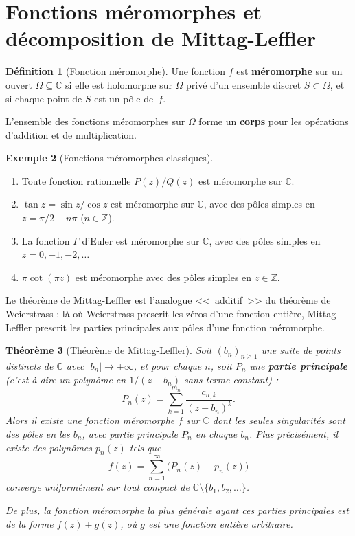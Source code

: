 \documentclass[12pt,a4paper,openany]{book}
\theoremstyle{definition}
\newtheorem{definition}{Définition}[chapter]
\newtheorem{exemple}[definition]{Exemple}
\theoremstyle{plain}
\newtheorem{theoreme}[definition]{Théorème}
\theoremstyle{remark}
\newcommand{\C}{\mathbb{C}}
\newcommand{\Z}{\mathbb{Z}}
\newcommand{\abs}[1]{\left|#1\right|}
\begin{document}
\section{Fonctions méromorphes et décomposition de Mittag-Leffler}%
\label{sec:mittag-leffler}

\begin{definition}[Fonction méromorphe]\label{def:fonction-meromorphe}
Une fonction $f$ est \textbf{méromorphe} sur un ouvert $\Omega \subseteq \C$
si elle est holomorphe sur $\Omega$ privé d'un ensemble discret $S \subset \Omega$,
et si chaque point de $S$ est un pôle de~$f$.

L'ensemble des fonctions méromorphes sur $\Omega$ forme un \textbf{corps}
pour les opérations d'addition et de multiplication.
\end{definition}

\begin{exemple}[Fonctions méromorphes classiques]\label{ex:meromorphes}
\begin{enumerate}[label=(\roman*)]
  \item Toute fonction rationnelle $P(z)/Q(z)$ est méromorphe sur $\C$.
  \item $\tan z = \sin z / \cos z$ est méromorphe sur $\C$, avec des pôles
    simples en $z = \pi/2 + n\pi$ ($n \in \Z$).
  \item La fonction $\Gamma$ d'Euler est méromorphe sur $\C$, avec des pôles
    simples en $z = 0, -1, -2, \ldots$
  \item $\pi \cot(\pi z)$ est méromorphe avec des pôles simples en $z \in \Z$.
\end{enumerate}
\end{exemple}

Le théorème de Mittag-Leffler est l'analogue <<~additif~>> du théorème de
Weierstrass : là où Weierstrass prescrit les zéros d'une fonction entière,
Mittag-Leffler prescrit les parties principales aux pôles d'une fonction
méromorphe.

\begin{theoreme}[Théorème de Mittag-Leffler]\label{thm:mittag-leffler}
Soit $(b_n)_{n \geq 1}$ une suite de points distincts de $\C$ avec
$\abs{b_n} \to +\infty$, et pour chaque $n$, soit $P_n$ une \textbf{partie
principale} (c'est-à-dire un polynôme en $1/(z - b_n)$ sans terme constant) :
\[
  P_n(z) = \sum_{k=1}^{m_n} \frac{c_{n,k}}{(z - b_n)^k}.
\]
Alors il existe une fonction méromorphe $f$ sur $\C$ dont les seules
singularités sont des pôles en les $b_n$, avec partie principale $P_n$ en
chaque $b_n$. Plus précisément, il existe des polynômes $p_n(z)$ tels que
\[
  f(z) = \sum_{n=1}^{\infty} \bigl(P_n(z) - p_n(z)\bigr)
\]
converge uniformément sur tout compact de $\C \setminus \{b_1, b_2, \ldots\}$.

De plus, la fonction méromorphe la plus générale ayant ces parties principales
est de la forme $f(z) + g(z)$, où $g$ est une fonction entière arbitraire.
\end{theoreme}
\end{document}
